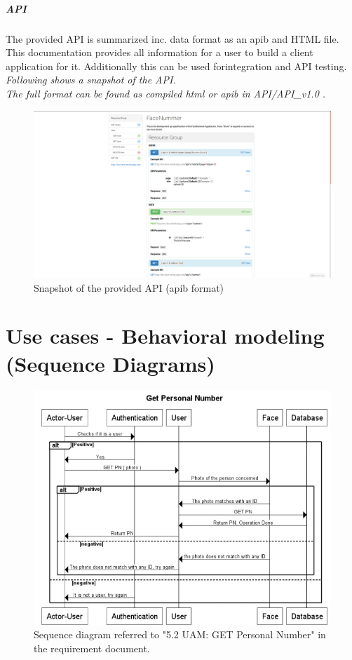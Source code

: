 \documentclass[a4paper,11pt]{article}
\begin{document}
\subparagraph{API }
The provided API is summarized inc. data format as an apib and HTML file. This documentation provides all information for a user to build a client application for it. Additionally this can be used forintegration and API testing. \\ \newline
\noindent
\textit{Following shows a snapshot of the API. \\ The full format can be found as compiled html or apib in API/API\_v1.0 .}
\newline
\begin{figure}[ht!]
    \centering
	\includegraphics[scale=0.3]{API/Snapshot_API.png}
		\caption{Snapshot of the provided API (apib format)}
\end{figure}

\newpage
\section{Use cases - Behavioral modeling (Sequence Diagrams)}

\begin{figure}[ht!]
	\centering
	\includegraphics[width=150mm]{SequenceDiagrams/GetPN.jpg}
	\caption{Sequence diagram referred to "5.2 UAM: GET Personal Number" in the requirement document. \label{1}}
\end{figure}
\end{document}
